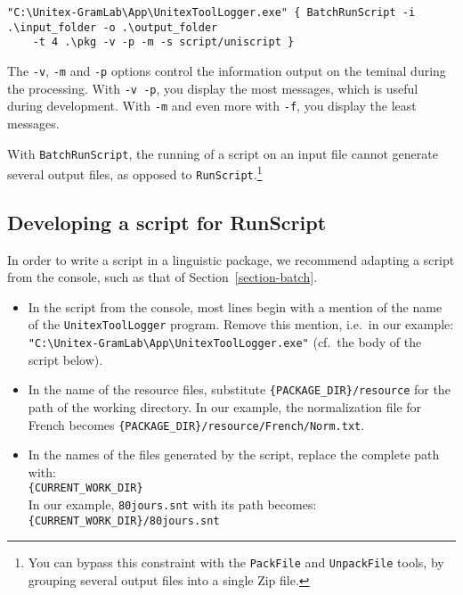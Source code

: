 \begin{Verbatim}[fontsize=\small,fontfamily=helvetica]
"C:\Unitex-GramLab\App\UnitexToolLogger.exe" { BatchRunScript -i .\input_folder -o .\output_folder 
    -t 4 .\pkg -v -p -m -s script/uniscript }
\end{Verbatim}

\noindent The \verb$-v$, \verb$-m$ and \verb$-p$ options control the information output on the
teminal during the processing. With \verb$-v -p$, you display the most messages, which is
useful during development. With \verb$-m$ and even more with \verb$-f$, you display the least
messages.

\bigskip
\noindent With \verb$BatchRunScript$, the running of a script on an input file cannot generate
several output files, as opposed to \verb$RunScript$.\footnote{You can bypass this constraint
with the \texttt{PackFile} and \texttt{UnpackFile} tools, by grouping several output files
into a single Zip file.}



\subsection{Developing a script for RunScript}
\label{section-script-for-runscript}
In order to write a script in a linguistic package, we recommend adapting a script from the
console, such as that of Section~\ref{section-batch}.

\begin{itemize}
\item In the script from the console, most lines begin with a mention of the name of the
\verb$UnitexToolLogger$ program. Remove this mention, i.e.\ in our example:\\
\verb$"C:\Unitex-GramLab\App\UnitexToolLogger.exe"$ (cf.\ the body of the script below).
\item In the name of the resource files, substitute
\verb${PACKAGE_DIR}/resource$ for the path of the working directory.
In our example, the normalization file for French becomes
\verb${PACKAGE_DIR}/resource/French/Norm.txt$.
\item In the names of the files generated by the script, replace the complete path with:\\
\verb${CURRENT_WORK_DIR}$\\
In our example, \verb$80jours.snt$ with its path
becomes:\\
\verb${CURRENT_WORK_DIR}/80jours.snt$
\end{itemize}

